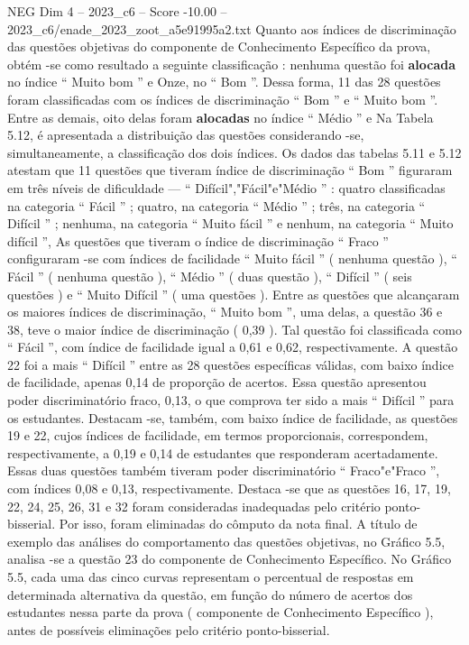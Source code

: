 \begin{textsample}{NEG Dim 4 – 2023\_c6 – Score -10.00 – 2023\_c6/enade\_2023\_zoot\_a5e91995a2.txt}
Quanto aos índices de discriminação das questões objetivas do componente de Conhecimento Específico da prova, obtém -se como resultado a seguinte classificação : nenhuma questão foi \textbf{alocada} no índice “ Muito bom ” e Onze, no “ Bom ”.
Dessa forma, 11 das 28 questões foram classificadas com os índices de discriminação “ Bom ” e “ Muito bom ”.
Entre as demais, oito delas foram \textbf{alocadas} no índice “ Médio ” e Na Tabela 5.12, é apresentada a distribuição das questões considerando -se, simultaneamente, a classificação dos dois índices.
Os dados das tabelas 5.11 e 5.12 atestam que 11 questões que tiveram índice de discriminação “ Bom ” figuraram em três níveis de dificuldade — “ Difícil","Fácil"e"Médio ” : quatro classificadas na categoria “ Fácil ” ; quatro, na categoria “ Médio ” ; três, na categoria “ Difícil ” ; nenhuma, na categoria “ Muito fácil ” e nenhum, na categoria “ Muito difícil ”, As questões que tiveram o índice de discriminação “ Fraco ” configuraram -se com índices de facilidade “ Muito fácil ” ( nenhuma questão ), “ Fácil ” ( nenhuma questão ), “ Médio ” ( duas questão ), “ Difícil ” ( seis questões ) e “ Muito Difícil ” ( uma questões ).
Entre as questões que alcançaram os maiores índices de discriminação, “ Muito bom ”, uma delas, a questão 36 e 38, teve o maior índice de discriminação ( 0,39 ).
Tal questão foi classificada como “ Fácil ”, com índice de facilidade igual a 0,61 e 0,62, respectivamente.
A questão 22 foi a mais “ Difícil ” entre as 28 questões específicas válidas, com baixo índice de facilidade, apenas 0,14 de proporção de acertos.
Essa questão apresentou poder discriminatório fraco, 0,13, o que comprova ter sido a mais “ Difícil ” para os estudantes.
Destacam -se, também, com baixo índice de facilidade, as questões 19 e 22, cujos índices de facilidade, em termos proporcionais, correspondem, respectivamente, a 0,19 e 0,14 de estudantes que responderam acertadamente.
Essas duas questões também tiveram poder discriminatório “ Fraco"e"Fraco ”, com índices 0,08 e 0,13, respectivamente.
Destaca -se que as questões 16, 17, 19, 22, 24, 25, 26, 31 e 32 foram consideradas inadequadas pelo critério ponto-bisserial.
Por isso, foram eliminadas do cômputo da nota final.
A título de exemplo das análises do comportamento das questões objetivas, no Gráfico 5.5, analisa -se a questão 23 do componente de Conhecimento Específico.
No Gráfico 5.5, cada uma das cinco curvas representam o percentual de respostas em determinada alternativa da questão, em função do número de acertos dos estudantes nessa parte da prova ( componente de Conhecimento Específico ), antes de possíveis eliminações pelo critério ponto-bisserial.

\end{textsample}

